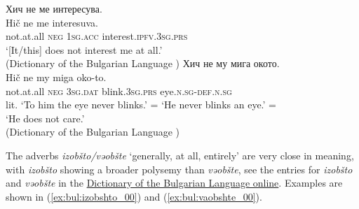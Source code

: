 \documentclass[output=paper,colorlinks=true, citecolor=brown]{langscibook}
\begin{document}
\ea \label{ex:bul:polarity-hich00}
    \ea Хич не ме интересува.\label{ex:bul:polarity-hich01}\\
        \gll Hič ne me interesuva.\\
            not.at.all \textsc{neg} \textsc{1sg.acc} interest.\textsc{ipfv.3sg.prs}\\
        \glt `[It\slash this] does not interest me at all.'\\(Dictionary of the Bulgarian Language \href{http://ibl.bas.bg/rbe/lang/bg/%D1%85%D0%B8%D1%87/}{\cite{IBE1993}}) 
    \ex Хич не му мига окото.\label{ex:bul:polarity-hich02}\\
        \gll Hič ne my miga oko-to.\\
            not.at.all \textsc{neg} \textsc{3sg.dat} blink.\textsc{3sg.prs} eye.\textsc{n.sg}-\textsc{def.n.sg}\\
        \glt lit. `To him the eye never blinks.' = `He never blinks an eye.' = \\`He does not care.' \\(Dictionary of the Bulgarian Language \href{http://ibl.bas.bg/rbe/lang/bg/%D1%85%D0%B8%D1%87/}{\cite{IBE1993}})
    \z 
\z 

The adverbs \textit{izobšto\slash vəobšte} `generally, at all, entirely' are very close in meaning, with \textit{izobšto} showing a broader polysemy than \textit{vəobšte}, see the entries for \textit{izobšto} 
and \textit{vəobšte} %
in the \href{https://ibl.bas.bg/rbe/}{Dictionary of the Bulgarian Language online}. Examples are shown in (\ref{ex:bul:izobshto_00}) and (\ref{ex:bul:vaobshte_00}).
\end{document}
